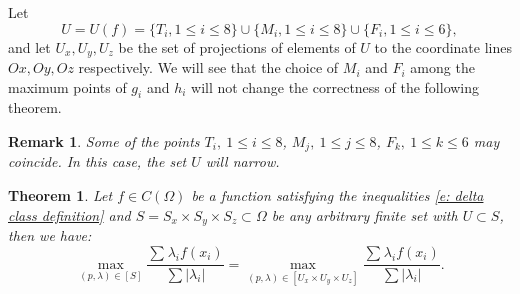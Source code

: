 \documentclass[12p]{article}
\numberwithin{equation}{section}
\newtheorem{theorem}{Theorem}[section]
\newtheorem{remark}{Remark}[section]
\begin{document}
Let \[U=U(f)=\{T_i, 1 \le i \le 8\} \cup\{M_i, 1 \le i \le 8\} \cup \{F_i, 1 \le i \le 6\},\]
and let \(U_x,U_y,U_z\) be the set of projections of elements of \(U\) to the coordinate lines \(Ox,Oy,Oz\) respectively. 
We will see that the choice of \(M_i\) and \(F_i\) among the maximum points of \(g_i\) and \(h_i\) will not change the correctness of the following theorem.

\begin{remark}
    Some of the points $T_i, \ 1 \le i \le 8$, $M_j, \ 1 \le j \le 8$, $F_k,\ 1 \le k \le 6$ may coincide. In this case, the set $U$ will narrow.
\end{remark}

\begin{theorem} \label{t:Theorem 1}
    Let \(f \in C(\Omega) \) be a function satisfying the inequalities \eqref{e: delta class definition} and  \(S =S_x \times S_y \times S_z \subset \Omega \) be any arbitrary finite set with \(U \subset S\), then we have:
    \begin{equation} \label{e:maximum-clarified}
        \max_{(p,\lambda)\in [S] }\frac{\sum_{}\lambda_if(x_i)}{\sum|\lambda_i|} =\max_{(p,\lambda) \in [U_x\times U_y \times U_z]}\frac{\sum_{} \lambda_if(x_i)}{\sum|\lambda_i|}.
    \end{equation}
\end{theorem}
\end{document}
